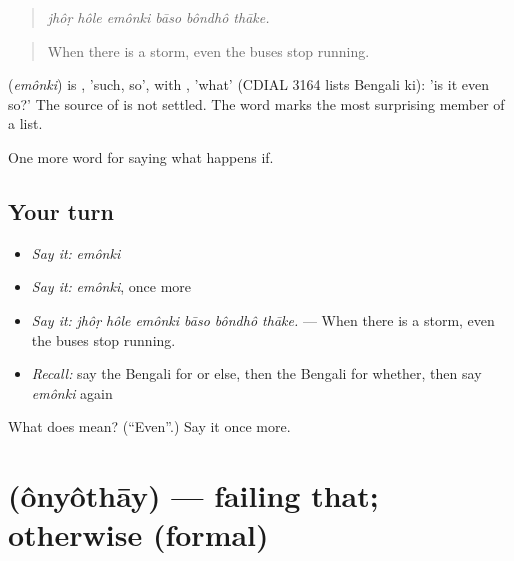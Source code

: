 \begin{quote}
     
\end{quote}

\begin{quote}
\emph{jhôṛ hôle emônki bāso bôndhô thāke.}
\end{quote}

\begin{quote}
When there is a storm, even the buses stop running.
\end{quote}

\begin{cousinweb}
\textbf{} (\emph{emônki}) is , 'such, so', with , 'what' (CDIAL 3164 lists Bengali ki): 'is it even so?' The source of  is not settled. The word marks the most surprising member of a list.
\end{cousinweb}

\begin{grammarlens}[title={What you've built}]
One more word for saying what happens if.
\end{grammarlens}

\subsection*{Your turn}
\begin{itemize}
\raggedright
  \item \emph{Say it:} \emph{emônki}
  \item \emph{Say it:} \emph{emônki}, once more
  \item \emph{Say it:} \emph{jhôṛ hôle emônki bāso bôndhô thāke.} — When there is a storm, even the buses stop running.
  \item \emph{Recall:} say the Bengali for or else, then the Bengali for whether, then say \emph{emônki} again
\end{itemize}

\begin{tcolorbox}[breakable,colback=teal!4,colframe=teal!35!black,title={Before you move on}]
What does  mean? (\textquotedblleft{}Even\textquotedblright{}.) Say it once more.
\end{tcolorbox}
\section[\texorpdfstring{\bn{অন্যথায়} (ônyôthāy)}{অন্যথায় (ônyôthāy)}]{ (ônyôthāy) — failing that; otherwise (formal)}

